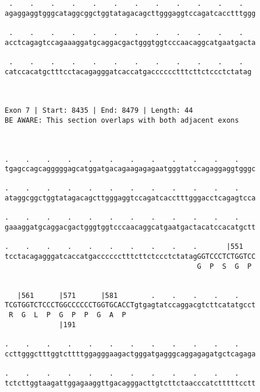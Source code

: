 \documentclass{article}
\begin{document}
\begin{Verbatim}
 .    .    .    .    .    .    .    .    .    .    .    .   
agaggaggtgggcataggcggctggtatagacagcttgggaggtccagatcacctttggg
                                                            
 .    .    .    .    .    .    .    .    .    .    .    .   
acctcagagtccagaaaggatgcaggacgactgggtggtcccaacaggcatgaatgacta
                                                            
 .    .    .    .    .    .    .    .    .    .    .    .  
catccacatgctttcctacagagggatcaccatgacccccctttcttctccctctatag
                                                           
                                                           
 
Exon 7 | Start: 8435 | End: 8479 | Length: 44
BE AWARE: This section overlaps with both adjacent exons



.    .    .    .    .    .    .    .    .    .    .    .    
tgagccagcagggggagcatggatgacagaagagagaatgggtatccagaggaggtgggc
                                                            
.    .    .    .    .    .    .    .    .    .    .    .    
ataggcggctggtatagacagcttgggaggtccagatcacctttgggacctcagagtcca
                                                            
.    .    .    .    .    .    .    .    .    .    .    .    
gaaaggatgcaggacgactgggtggtcccaacaggcatgaatgactacatccacatgctt
                                                            
.    .    .    .    .    .    .    .    .    .       |551   
tcctacagagggatcaccatgacccccctttcttctccctctatagGGTCCCTCTGGTCC
                                              G  P  S  G  P 
                                                            
  
   |561      |571      |581        .    .    .    .    .    
TCGTGGTCTCCCTGGCCCCCCTGGTGCACCTgtgagtatccaggacgtcttcatatgcct
 R  G  L  P  G  P  P  G  A  P                               
             |191                                           
  
.    .    .    .    .    .    .    .    .    .    .    .    
ccttgggctttggtcttttggagggaagactgggatgagggcaggagagatgctcagaga
                                                            
.    .    .    .    .    .    .    .    .    .    .    .    
tctcttggtaagattggagaaggttgacagggacttgtcttctaacccatctttttcctt
                                                            

\end{Verbatim}
\end{document}
